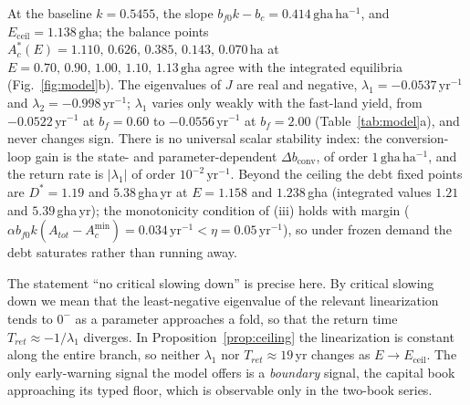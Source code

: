 \documentclass[preprint,12pt,authoryear]{elsarticle}
\newcommand{\dconv}{\Delta b_{\mathrm{conv}}}
\newcommand{\Eceil}{E_{\mathrm{ceil}}}
\newcommand{\Acmin}{A_c^{\min}}
\begin{document}
At the baseline $k=0.5455$, the slope $b_{f0}k-b_c=0.414\,\mathrm{gha\,ha^{-1}}$, and $\Eceil=1.138\,\mathrm{gha}$; the balance points $A_c^*(E)=1.110,\,0.626,\,0.385,\,0.143,\,0.070\,\mathrm{ha}$ at $E=0.70,\,0.90,\,1.00,\,1.10,\,1.13\,\mathrm{gha}$ agree with the integrated equilibria (Fig.~\ref{fig:model}b). The eigenvalues of $J$ are real and negative, $\lambda_1=-0.0537\,\mathrm{yr}^{-1}$ and $\lambda_2=-0.998\,\mathrm{yr}^{-1}$; $\lambda_1$ varies only weakly with the fast-land yield, from $-0.0522\,\mathrm{yr}^{-1}$ at $b_f=0.60$ to $-0.0556\,\mathrm{yr}^{-1}$ at $b_f=2.00$ (Table~\ref{tab:model}a), and never changes sign. There is no universal scalar stability index: the conversion-loop gain is the state- and parameter-dependent $\dconv$, of order $1\,\mathrm{gha\,ha^{-1}}$, and the return rate is $|\lambda_1|$ of order $10^{-2}\,\mathrm{yr}^{-1}$. Beyond the ceiling the debt fixed points are $D^*=1.19$ and $5.38$\,gha\,yr at $E=1.158$ and $1.238$\,gha (integrated values $1.21$ and $5.39$\,gha\,yr); the monotonicity condition of (iii) holds with margin ($\alpha b_{f0}k(A_{tot}-\Acmin)=0.034\,\mathrm{yr}^{-1}<\eta=0.05\,\mathrm{yr}^{-1}$), so under frozen demand the debt saturates rather than running away.

The statement ``no critical slowing down'' is precise here. By critical slowing down we mean that the least-negative eigenvalue of the relevant linearization tends to $0^-$ as a parameter approaches a fold, so that the return time $T_{ret}\approx-1/\lambda_1$ diverges. In Proposition~\ref{prop:ceiling} the linearization is constant along the entire branch, so neither $\lambda_1$ nor $T_{ret}\approx19$\,yr changes as $E\to\Eceil$. The only early-warning signal the model offers is a \emph{boundary} signal, the capital book approaching its typed floor, which is observable only in the two-book series.
\end{document}
